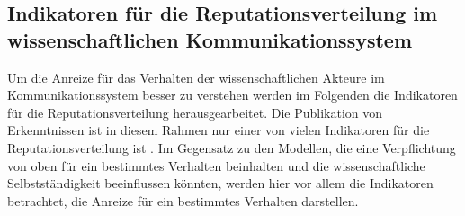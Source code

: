 \subsection{Indikatoren für die Reputationsverteilung im wissenschaftlichen Kommunikationssystem}

Um die Anreize für das Verhalten der wissenschaftlichen Akteure im Kommunikationssystem besser zu verstehen werden im Folgenden die Indikatoren für die Reputationsverteilung herausgearbeitet. Die Publikation von Erkenntnissen ist in diesem Rahmen nur einer von vielen Indikatoren für die Reputationsverteilung ist \cite{Hirschauer_2004}. Im Gegensatz zu den Modellen, die eine Verpflichtung von oben für ein bestimmtes Verhalten beinhalten und die wissenschaftliche Selbstständigkeit beeinflussen könnten, werden hier vor allem die Indikatoren betrachtet, die Anreize für ein bestimmtes Verhalten darstellen.

